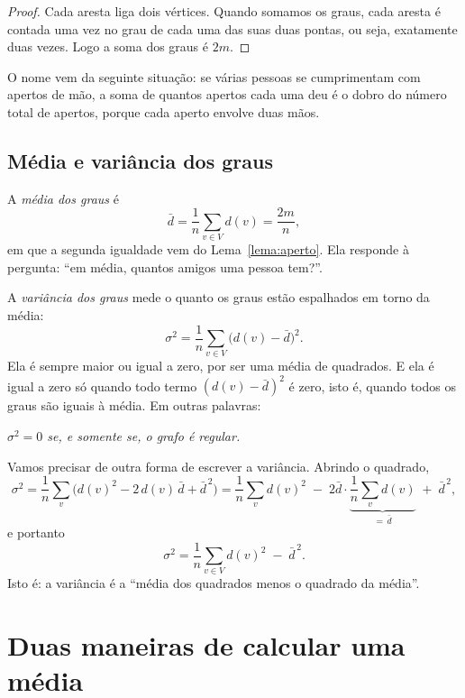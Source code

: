 \documentclass[12pt,a4paper]{article}
\theoremstyle{plain}
\theoremstyle{definition}
\theoremstyle{remark}
\newcommand{\dm}{\bar d}          %
\begin{document}
\begin{proof}
Cada aresta liga dois vértices. Quando somamos os graus, cada aresta é
contada uma vez no grau de cada uma das suas duas pontas, ou seja,
exatamente duas vezes. Logo a soma dos graus é $2m$.
\end{proof}

O nome vem da seguinte situação: se várias pessoas se cumprimentam com
apertos de mão, a soma de quantos apertos cada uma deu é o dobro do
número total de apertos, porque cada aperto envolve duas mãos.

\subsection{Média e variância dos graus}

A \emph{média dos graus} é
\[
\dm = \frac{1}{n}\sum_{v\in V} d(v) = \frac{2m}{n},
\]
em que a segunda igualdade vem do Lema~\ref{lema:aperto}. Ela responde
à pergunta: “em média, quantos amigos uma pessoa tem?”.

A \emph{variância dos graus} mede o quanto os graus estão espalhados em
torno da média:
\[
\sigma^2 = \frac{1}{n}\sum_{v\in V}\bigl(d(v)-\dm\bigr)^2 .
\]
Ela é sempre maior ou igual a zero, por ser uma média de quadrados. E
ela é igual a zero só quando todo termo $(d(v)-\dm)^2$ é zero, isto é,
quando todos os graus são iguais à média. Em outras palavras:
\begin{center}
\emph{$\sigma^2 = 0$ se, e somente se, o grafo é regular.}
\end{center}

Vamos precisar de outra forma de escrever a variância. Abrindo o
quadrado,
\[
\sigma^2
= \frac{1}{n}\sum_{v}\bigl(d(v)^2 - 2\,d(v)\,\dm + \dm^{\,2}\bigr)
= \frac{1}{n}\sum_{v} d(v)^2 \;-\; 2\dm\cdot\underbrace{\frac{1}{n}\sum_{v} d(v)}_{=\,\dm} \;+\; \dm^{\,2},
\]
e portanto
\begin{equation}\label{eq:var}
\sigma^2 = \frac{1}{n}\sum_{v\in V} d(v)^2 \;-\; \dm^{\,2}.
\end{equation}
Isto é: a variância é a “média dos quadrados menos o quadrado da média”.

\section{Duas maneiras de calcular uma média}\label{sec:medias}
\end{document}
